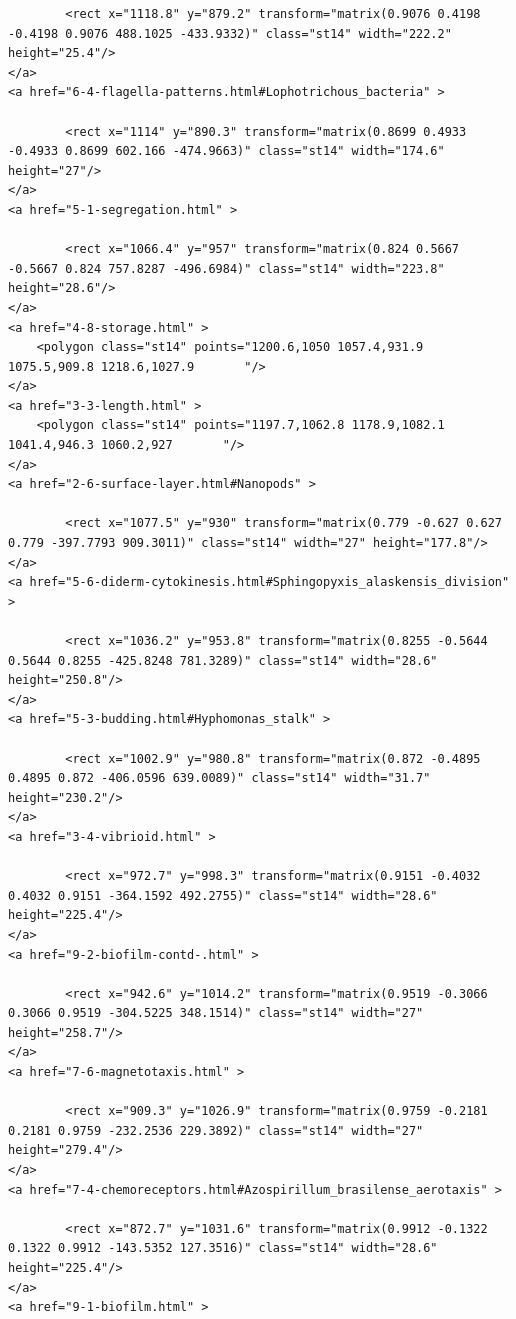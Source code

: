 \documentclass[]{tufte-book}
\begin{document}
\begin{verbatim}
        <rect x="1118.8" y="879.2" transform="matrix(0.9076 0.4198 -0.4198 0.9076 488.1025 -433.9332)" class="st14" width="222.2" height="25.4"/>
</a>
<a href="6-4-flagella-patterns.html#Lophotrichous_bacteria" >

        <rect x="1114" y="890.3" transform="matrix(0.8699 0.4933 -0.4933 0.8699 602.166 -474.9663)" class="st14" width="174.6" height="27"/>
</a>
<a href="5-1-segregation.html" >

        <rect x="1066.4" y="957" transform="matrix(0.824 0.5667 -0.5667 0.824 757.8287 -496.6984)" class="st14" width="223.8" height="28.6"/>
</a>
<a href="4-8-storage.html" >
    <polygon class="st14" points="1200.6,1050 1057.4,931.9 1075.5,909.8 1218.6,1027.9       "/>
</a>
<a href="3-3-length.html" >
    <polygon class="st14" points="1197.7,1062.8 1178.9,1082.1 1041.4,946.3 1060.2,927       "/>
</a>
<a href="2-6-surface-layer.html#Nanopods" >

        <rect x="1077.5" y="930" transform="matrix(0.779 -0.627 0.627 0.779 -397.7793 909.3011)" class="st14" width="27" height="177.8"/>
</a>
<a href="5-6-diderm-cytokinesis.html#Sphingopyxis_alaskensis_division" >

        <rect x="1036.2" y="953.8" transform="matrix(0.8255 -0.5644 0.5644 0.8255 -425.8248 781.3289)" class="st14" width="28.6" height="250.8"/>
</a>
<a href="5-3-budding.html#Hyphomonas_stalk" >

        <rect x="1002.9" y="980.8" transform="matrix(0.872 -0.4895 0.4895 0.872 -406.0596 639.0089)" class="st14" width="31.7" height="230.2"/>
</a>
<a href="3-4-vibrioid.html" >

        <rect x="972.7" y="998.3" transform="matrix(0.9151 -0.4032 0.4032 0.9151 -364.1592 492.2755)" class="st14" width="28.6" height="225.4"/>
</a>
<a href="9-2-biofilm-contd-.html" >

        <rect x="942.6" y="1014.2" transform="matrix(0.9519 -0.3066 0.3066 0.9519 -304.5225 348.1514)" class="st14" width="27" height="258.7"/>
</a>
<a href="7-6-magnetotaxis.html" >

        <rect x="909.3" y="1026.9" transform="matrix(0.9759 -0.2181 0.2181 0.9759 -232.2536 229.3892)" class="st14" width="27" height="279.4"/>
</a>
<a href="7-4-chemoreceptors.html#Azospirillum_brasilense_aerotaxis" >

        <rect x="872.7" y="1031.6" transform="matrix(0.9912 -0.1322 0.1322 0.9912 -143.5352 127.3516)" class="st14" width="28.6" height="225.4"/>
</a>
<a href="9-1-biofilm.html" >


\end{verbatim}
\end{document}
